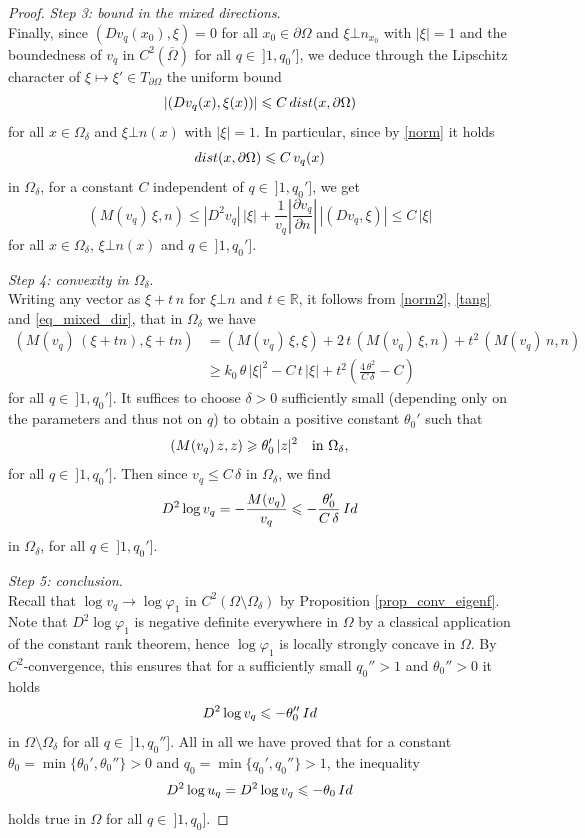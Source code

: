 \documentclass[12pt]{amsart}
\numberwithin{equation}{section}
\theoremstyle{plain}
\theoremstyle{plain}
\theoremstyle{plain}
\theoremstyle{definition}
\newcommand{\R}{{\mathbb R}}
\newcommand{\beq}{\begin{equation}}
\newcommand{\eeq}{\end{equation}}
\renewcommand{\le}{\leqslant}
\renewcommand{\ge}{\geqslant}
\begin{document}
\begin{proof}
 \smallskip
 {\em Step 3: bound in the mixed directions}.\ \\
 Finally, since $(Dv_q(x_0), \xi)=0$ for all $x_0\in \partial\Omega$ and $\xi\bot n_{x_0}$ with $|\xi|=1$ and the boundedness of $v_q$ in $C^2(\overline{\Omega})$ for all $q\in \ ]1, q_0']$, we deduce through the Lipschitz character of $\xi\mapsto \xi'\in T_{\partial \Omega}$ the uniform bound
 \[
|(Dv_q(x), \xi(x))|\le C\, {\rm dist}(x, \partial\Omega)
 \]
for all $x\in \Omega_\delta$ and $\xi\bot n(x)$ with $|\xi|=1$. In particular, since by \eqref{norm} it holds
\[
{\rm dist}(x, \partial\Omega)\le C\, v_q(x)
\]
in $\Omega_\delta$, for a constant $C$ independent of $q\in \ ]1, q_0']$, we get 
\begin{equation}\label{eq_mixed_dir}
\left(M(v_q)\, \xi, n\right)\le |D^2 v_q|\, |\xi|+ \frac{1}{v_q} \left|\frac{\partial v_q}{\partial n}\right|\, \left|(Dv_q, \xi)\right|\le C\, |\xi|
\end{equation}
for all $x\in \Omega_\delta$, $\xi\bot n(x)$ and $q\in \ ]1, q_0']$.

 \smallskip
 {\em Step 4: convexity in $\Omega_{\delta}$}.\ \\
Writing any vector as $\xi+t\, n$ for $\xi\bot n$ and $t\in \R$, it follows from \eqref{norm2}, \eqref{tang} and \eqref{eq_mixed_dir}, that in $\Omega_\delta$ we have
 \[
 \begin{split}
 \left(M(v_q) \, (\xi+tn), \xi+tn\right)&=(M(v_q)\, \xi, \xi) +2\, t\, (M(v_q)\, \xi, n)+t^2\, (M(v_q) \, n, n)\\
 &\ge 
 k_0\, \theta\, |\xi|^2-C\, t\, |\xi| +t^2\left(\frac{4\, \theta^2}{C\, \delta}- C\right)
 \end{split}
 \]
 for all $q\in \ ]1, q_0']$. It suffices to choose $\delta>0$ sufficiently small (depending only on the parameters and thus not on $q$) to obtain a positive constant $\theta_0'$ such that
 \[
\left( M(v_q)\, z, z\right)\ge \theta_0'\, |z|^2 \quad \hbox{in $\Omega_{\delta}$},
\]
for all $q\in \ ]1, q_0']$. Then since $v_q\le C\, \delta $ in $\Omega_\delta$, we find
 \[
 D^2\log v_q=-\frac{M(v_q)}{v_q}\le -\frac{\theta_0'}{C\, \delta}\, {\rm Id} 
 \]
in $\Omega_\delta$, for all $q\in \ ]1, q_0']$. 
 
 \smallskip
 {\em Step 5: conclusion}.\ \\
Recall that $\log v_q\to \log \varphi_1$ in $C^2(\Omega\setminus\Omega_\delta)$ by Proposition \ref{prop_conv_eigenf}. Note that $D^2\log\varphi_1$ is negative definite everywhere in $\Omega$ by a classical application of the constant rank theorem, hence $\log\varphi_1$ is locally strongly concave in $\Omega$. 
By $C^2$-convergence, this ensures that for a sufficiently small $q_0''>1$ and $\theta_0''>0$ it holds
 \[
 D^2\log v_q\le -\theta_0''\, {\rm Id}
 \]
 in $\Omega\setminus \Omega_\delta$ for all $q\in \ ]1, q_0'']$. 
All in all we have proved that for a constant $\theta_0=\min\{\theta_0', \theta_0''\}>0$ and $q_0=\min\{q_0', q_0''\}>1$, the inequality
 \beq
 \label{d2l}
 D^2\log u_q=D^2\log v_q\le -\theta_0\, {\rm Id}
 \eeq
 holds true in $\Omega$ for all $q\in \ ]1, q_0]$.


\end{proof}
\end{document}
